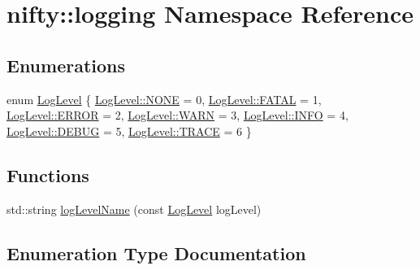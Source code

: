 \hypertarget{namespacenifty_1_1logging}{}\section{nifty\+:\+:logging Namespace Reference}
\label{namespacenifty_1_1logging}
\subsection*{Enumerations}
\begin{DoxyCompactItemize}
\item 
enum \hyperlink{namespacenifty_1_1logging_a3385625f9a0dbb17f70c47d3fca2f64d}{Log\+Level} \{ \newline
\hyperlink{namespacenifty_1_1logging_a3385625f9a0dbb17f70c47d3fca2f64dab50339a10e1de285ac99d4c3990b8693}{Log\+Level\+::\+N\+O\+NE} = 0, 
\hyperlink{namespacenifty_1_1logging_a3385625f9a0dbb17f70c47d3fca2f64da19da7170bea36556dde582519795f3fc}{Log\+Level\+::\+F\+A\+T\+AL} = 1, 
\hyperlink{namespacenifty_1_1logging_a3385625f9a0dbb17f70c47d3fca2f64dabb1ca97ec761fc37101737ba0aa2e7c5}{Log\+Level\+::\+E\+R\+R\+OR} = 2, 
\hyperlink{namespacenifty_1_1logging_a3385625f9a0dbb17f70c47d3fca2f64da32bd8a1db2275458673903bdb84cb277}{Log\+Level\+::\+W\+A\+RN} = 3, 
\newline
\hyperlink{namespacenifty_1_1logging_a3385625f9a0dbb17f70c47d3fca2f64da551b723eafd6a31d444fcb2f5920fbd3}{Log\+Level\+::\+I\+N\+FO} = 4, 
\hyperlink{namespacenifty_1_1logging_a3385625f9a0dbb17f70c47d3fca2f64dadc30ec20708ef7b0f641ef78b7880a15}{Log\+Level\+::\+D\+E\+B\+UG} = 5, 
\hyperlink{namespacenifty_1_1logging_a3385625f9a0dbb17f70c47d3fca2f64da2d3e4144aa384b18849ab9a8abad74d6}{Log\+Level\+::\+T\+R\+A\+CE} = 6
 \}
\end{DoxyCompactItemize}
\subsection*{Functions}
\begin{DoxyCompactItemize}
\item 
std\+::string \hyperlink{namespacenifty_1_1logging_a71e51d733eeaede804a36fd8dea1a28e}{log\+Level\+Name} (const \hyperlink{namespacenifty_1_1logging_a3385625f9a0dbb17f70c47d3fca2f64d}{Log\+Level} log\+Level)
\end{DoxyCompactItemize}


\subsection{Enumeration Type Documentation}
\mbox{\label{namespacenifty_1_1logging_a3385625f9a0dbb17f70c47d3fca2f64d}} 
